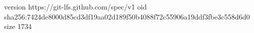 version https://git-lfs.github.com/spec/v1
oid sha256:7424de8000d85cd3df19aa02d189f50b4088f72c55906a19ddf3fbe3c558d6d0
size 1734
